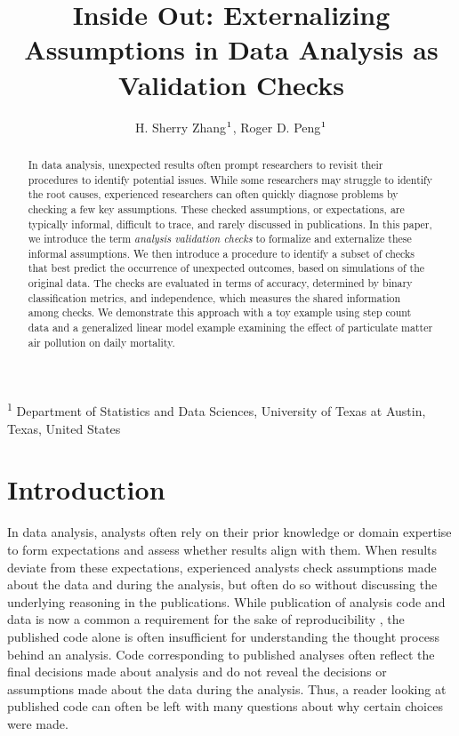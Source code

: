 \documentclass[
  12pt,
]{interact}
\title{Inside Out: Externalizing Assumptions in Data Analysis as
Validation Checks}
\author{H. Sherry Zhang$\textsuperscript{1}$, Roger D.
Peng$\textsuperscript{1}$}
\begin{document}
\captionsetup{labelsep=space}
\maketitle
\textsuperscript{1} Department of Statistics and Data
Sciences, University of Texas at Austin, Texas, United States
\begin{abstract}
In data analysis, unexpected results often prompt researchers to revisit
their procedures to identify potential issues. While some researchers
may struggle to identify the root causes, experienced researchers can
often quickly diagnose problems by checking a few key assumptions. These
checked assumptions, or expectations, are typically informal, difficult
to trace, and rarely discussed in publications. In this paper, we
introduce the term \emph{analysis validation checks} to formalize and
externalize these informal assumptions. We then introduce a procedure to
identify a subset of checks that best predict the occurrence of
unexpected outcomes, based on simulations of the original data. The
checks are evaluated in terms of accuracy, determined by binary
classification metrics, and independence, which measures the shared
information among checks. We demonstrate this approach with a toy
example using step count data and a generalized linear model example
examining the effect of particulate matter air pollution on daily
mortality.
\end{abstract}


\section{Introduction}\label{introduction}

In data analysis, analysts often rely on their prior knowledge or domain
expertise to form expectations and assess whether results align with
them. When results deviate from these expectations, experienced analysts
check assumptions made about the data and during the analysis, but often
do so without discussing the underlying reasoning in the publications.
While publication of analysis code and data is now a common a
requirement for the sake of reproducibility
\citep{peng2011reproducible}, the published code alone is often
insufficient for understanding the thought process behind an analysis.
Code corresponding to published analyses often reflect the final
decisions made about analysis and do not reveal the decisions or
assumptions made about the data during the analysis. Thus, a reader
looking at published code can often be left with many questions about
why certain choices were made.
\end{document}
